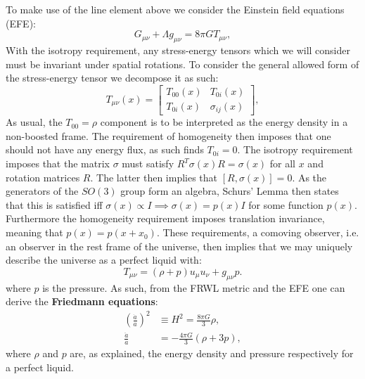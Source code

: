 \documentclass[%
reprint,
 amsmath,amssymb,
 aps,
]{revtex4-2}
\begin{document}
To make use of the line element above we consider the Einstein field equations (EFE):
\begin{equation}
	G_{\mu\nu}+\Lambda g_{\mu\nu}=8\pi G T_{\mu\nu},\label{eq:EFE}
\end{equation}
With the isotropy requirement, any stress-energy tensors which we will consider must be invariant under spatial rotations. To consider the general allowed form of the stress-energy tensor we decompose it as such:
\[T_{\mu\nu}(x)=\begin{bmatrix}
	T_{00}(x) & T_{0i}(x)\\
	T_{0i}(x) & \sigma_{ij}(x)
\end{bmatrix},\]
As usual, the $T_{00}=\rho$ component is to be interpreted as the energy density in a non-boosted frame. The requirement of homogeneity then imposes that one should not have any energy flux, as such finds $T_{0i}=0$. The isotropy requirement imposes that the matrix $\sigma$ must satisfy $R^T\sigma(x) R=\sigma(x)$ for all $x$ and rotation matrices $R$. The latter then implies that $[R,\sigma(x)]=0$. As the generators of the $SO(3)$ group form an algebra, Schurs' Lemma then states that this is satisfied iff $\sigma(x)\propto I\implies \sigma(x)=p(x)I$ for some function $p(x)$. Furthermore the homogeneity requirement imposes translation invariance, meaning that $p(x)=p(x+x_0)$. These requirements, a comoving observer, i.e. an observer in the rest frame of the universe, then implies that we may uniquely describe the universe as a perfect liquid with:
\[T_{\mu\nu}=(\rho+p)u_\mu u_\nu+g_{\mu\nu}p.\]
where $p$ is the pressure. As such, from the FRWL metric and the EFE one can derive the \textbf{Friedmann equations}:
\begin{align}
	\label{eq:F1}
	\left(\frac{\dot{a}}{a}\right)^2&\equiv H^2=\frac{8\pi G}{3}\rho,\\
	\label{eq:F2}
	\frac{\ddot{a}}{a}&=-\frac{4\pi G}{3}(\rho+3p),
\end{align}
where $\rho$ and $p$ are, as explained, the energy density and pressure respectively for a perfect liquid. 
\end{document}
